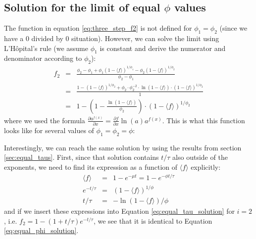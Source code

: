 \documentclass{article}
\newcommand{\fin}{\ensuremath{\langle f \rangle}}
\begin{document}
\subsection{Solution for the limit of equal \texorpdfstring{$\phi$}{phi} values}
The function in equation \ref{eq:three_step_f2} is not defined for $\phi_1 = \phi_2$ (since we have a 0 divided by 0 situation). However, we can solve the limit using L'H\^{o}pital's rule (we assume $\phi_1$ is constant and derive the numerator and denominator according to $\phi_2$):
\begin{eqnarray}
	f_2 &=& 
	\frac{\phi_2 - \phi_1 + \phi_1 (1-\fin)^{1/{\phi_1}} - \phi_2 (1-\fin)^{1/{\phi_2}}}{\phi_2 - \phi_1}
	\nonumber\\
	&=& \frac{1 - (1-\fin)^{1/{\phi_2}} + \phi_2 \cdot \phi_2^{-2} \cdot \ln{(1-\fin)} \cdot(1-\fin)^{1/{\phi_2}}}{1}
	\nonumber\\
	&=& 1 - \left(1 - \frac{\ln{(1-\fin)}}{\phi_2} \right) \cdot (1-\fin)^{1/{\phi_2}} \label{eq:equal_phi_solution}
\end{eqnarray}
where we used the formula $\frac{\partial a^{f(x)}}{\partial x} = \frac{\partial f}{\partial x}\ln(a) a^{f(x)}$. This is what this function looks like for several values of $\phi_1 = \phi_2 = \phi$:
\begin{center}
\end{center}

Interestingly, we can reach the same solution by using the results from section \ref{sec:equal_taus}. First, since that solution contains $t/\tau$ also outside of the exponents, we need to find its expression as a function of $\fin$ explicitly:
\begin{eqnarray}
	\fin &=& 1 - e^{-\mu t} = 1 - e^{-\phi t / \tau} \\
	e^{-t/\tau} &=& (1 - \fin)^{1/\phi} \\
	t/\tau &=& -\ln{\left(1 - \fin\right)} / \phi
\end{eqnarray}
and if we insert these expressions into Equation \ref{eq:equal_tau_solution} for $i=2$, i.e. $f_2 = 1 - \left(1 + t/\tau \right) e^{-t/\tau}$, we see that it is identical to Equation \ref{eq:equal_phi_solution}.
\end{document}
